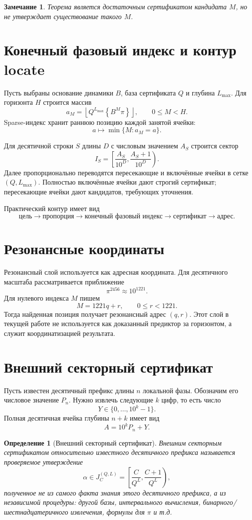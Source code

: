 \documentclass[11pt,a4paper]{article}
\newtheorem{definition}{Определение}
\newtheorem{remark}{Замечание}
\newcommand{\fracpart}[1]{\left\{#1\right\}}
\newcommand{\floor}[1]{\left\lfloor #1 \right\rfloor}
\begin{document}
\begin{remark}
Теорема является достаточным сертификатом кандидата $M$, но не утверждает существование такого $M$.
\end{remark}

\section{Конечный фазовый индекс и контур locate}

Пусть выбраны основание динамики $B$, база сертификата $Q$ и глубина $L_{\max}$.  Для горизонта $H$ строится массив
\[
  a_M=\floor{Q^{L_{\max}}\fracpart{B^M\pi}},\qquad 0\le M<H.
\]
Sparse-индекс хранит раннюю позицию каждой занятой ячейки:
\[
  a\mapsto \min\{M:a_M=a\}.
\]

Для десятичной строки $S$ длины $D$ с числовым значением $A_S$ строится сектор
\[
  I_S=\left[\frac{A_S}{10^D},\frac{A_S+1}{10^D}\right).
\]
Далее пропорционально переводятся пересекающие и включённые ячейки в сетке $(Q,L_{\max})$.  Полностью включённые ячейки дают строгий сертификат; пересекающие ячейки дают кандидатов, требующих уточнения.

Практический контур имеет вид
\[
  \text{цель}\to\text{пропорция}\to\text{конечный фазовый индекс}\to\text{сертификат}\to\text{адрес}.
\]

\section{Резонансные координаты}

Резонансный слой используется как адресная координата.  Для десятичного масштаба рассматривается приближение
\[
  \pi^{2456}\approx 10^{1221}.
\]
Для нулевого индекса $M$ пишем
\[
  M=1221q+r,
  \qquad 0\le r<1221.
\]
Тогда найденная позиция получает резонансный адрес $(q,r)$.  Этот слой в текущей работе не используется как доказанный предиктор за горизонтом, а служит координатизацией результата.

\section{Внешний секторный сертификат}

Пусть известен десятичный префикс длины $n$ локальной фазы.  Обозначим его числовое значение $P_n$.  Нужно извлечь следующие $k$ цифр, то есть число
\[
  Y\in\{0,\dots,10^k-1\}.
\]
Полная десятичная ячейка глубины $n+k$ имеет вид
\[
  A=10^kP_n+Y.
\]

\begin{definition}[Внешний секторный сертификат]
Внешним секторным сертификатом относительно известного десятичного префикса называется проверяемое утверждение
\[
  \alpha\in J_C^{(Q,L)}=\left[\frac{C}{Q^L},\frac{C+1}{Q^L}\right),
\]
полученное не из самого факта знания этого десятичного префикса, а из независимой процедуры: другой базы, интервального вычисления, бинарного/шестнадцатеричного извлечения, формулы для $\pi$ и т.д.
\end{definition}
\end{document}

